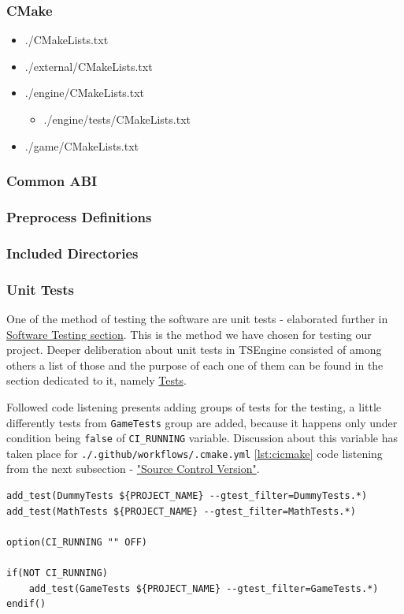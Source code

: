\subsubsection{CMake}
\begin{itemize}
    \item ./CMakeLists.txt
    \item ./external/CMakeLists.txt
    \item ./engine/CMakeLists.txt
        \begin{itemize}
            \item ./engine/tests/CMakeLists.txt
        \end{itemize}
    \item ./game/CMakeLists.txt
\end{itemize}

\subsubsection{Common ABI}
\label{sec:abi}

\subsubsection{Preprocess Definitions}

\subsubsection{Included Directories}

\subsubsection{Unit Tests}
\label{sec:build_unit_tests}
One of the method of testing the software are unit tests - elaborated further in \hyperref[sec:testing]{Software Testing section}. This is the method we have chosen for testing our project.
Deeper deliberation about unit tests in TSEngine consisted of among others a list of those and the purpose of each one of them can be found in the section dedicated to it, namely \hyperref[sec:tests]{Tests}.

Followed code listening presents adding groups of tests for the testing, a little differently tests from \texttt{GameTests} group are added, because it happens only under condition being \texttt{false} of \texttt{CI\_RUNNING} variable.
Discussion about this variable has taken place for \texttt{./.github/workflows/.cmake.yml} \ref{lst:cicmake} code listening from the next subsection - \hyperref[sec:scv]{"Source Control Version"}.
\begin{lstlisting}[caption=Adding tests to CTest (./engine/CMakeLists.txt)]
add_test(DummyTests ${PROJECT_NAME} --gtest_filter=DummyTests.*)
add_test(MathTests ${PROJECT_NAME} --gtest_filter=MathTests.*)

option(CI_RUNNING "" OFF)

if(NOT CI_RUNNING)
    add_test(GameTests ${PROJECT_NAME} --gtest_filter=GameTests.*)
endif()
\end{lstlisting}


